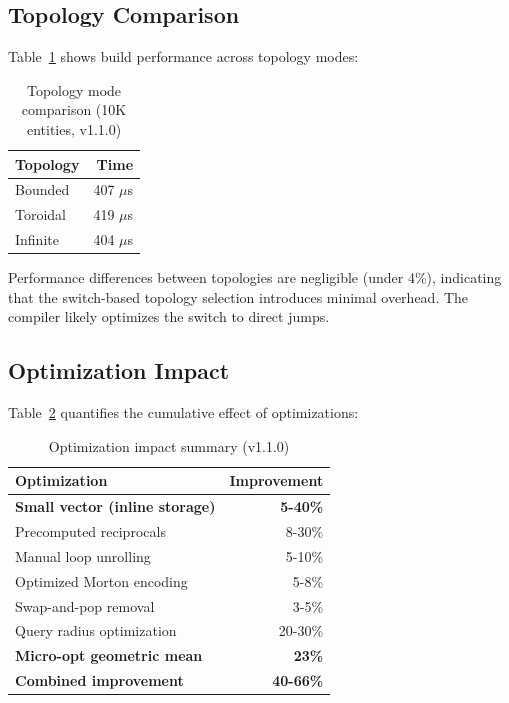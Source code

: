 \documentclass[11pt]{article}
\begin{document}
\subsection{Topology Comparison}

Table~\ref{tab:topology} shows build performance across topology modes:

\begin{table}[h]
\centering
\caption{Topology mode comparison (10K entities, v1.1.0)}
\label{tab:topology}
\begin{tabular}{lr}
\toprule
Topology & Time \\
\midrule
Bounded & 407 $\mu$s \\
Toroidal & 419 $\mu$s \\
Infinite & 404 $\mu$s \\
\bottomrule
\end{tabular}
\end{table}

Performance differences between topologies are negligible (under 4\%), indicating that the switch-based topology selection introduces minimal overhead. The compiler likely optimizes the switch to direct jumps.

\subsection{Optimization Impact}

Table~\ref{tab:optimization} quantifies the cumulative effect of optimizations:

\begin{table}[h]
\centering
\caption{Optimization impact summary (v1.1.0)}
\label{tab:optimization}
\begin{tabular}{lr}
\toprule
Optimization & Improvement \\
\midrule
\textbf{Small vector (inline storage)} & \textbf{5-40\%} \\
Precomputed reciprocals & 8-30\% \\
Manual loop unrolling & 5-10\% \\
Optimized Morton encoding & 5-8\% \\
Swap-and-pop removal & 3-5\% \\
Query radius optimization & 20-30\% \\
\midrule
\textbf{Micro-opt geometric mean} & \textbf{23\%} \\
\textbf{Combined improvement} & \textbf{40-66\%} \\
\bottomrule
\end{tabular}
\end{table}
\end{document}
